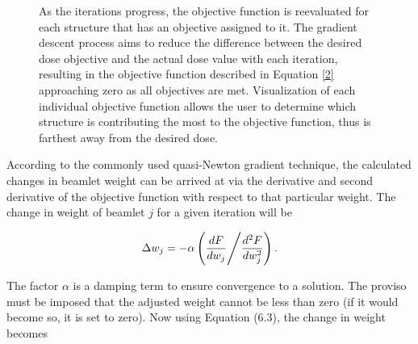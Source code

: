 \begin{figure}[H]
    \centering
    \caption{As the iterations progress, the objective function is reevaluated for each structure that has an objective assigned to it. The gradient descent process aims to reduce the difference between the desired dose objective and the actual dose value with each iteration, resulting in the objective function described in Equation \ref{2} approaching zero as all objectives are met. Visualization of each individual objective function allows the user to determine which structure is contributing the most to the objective function, thus is farthest away from the desired dose.}
    \label{fig:6.13}
\end{figure}

According to the commonly used quasi-Newton gradient technique, the calculated changes in beamlet weight can be arrived at via the derivative and second derivative of the objective function with respect to that particular weight. The change in weight of beamlet $j$ for a given iteration will be

\begin{equation}
    \Delta w_j = -\alpha \left( \frac{dF}{dw_j} \middle/ \frac{d^2F}{dw_j^2} \right) .
    \label{3}
\end{equation}

The factor $\alpha$ is a damping term to ensure convergence to a solution. The proviso must be imposed that the adjusted weight cannot be less than zero (if it would become so, it is set to zero). Now using Equation (6.3), the change in weight becomes

